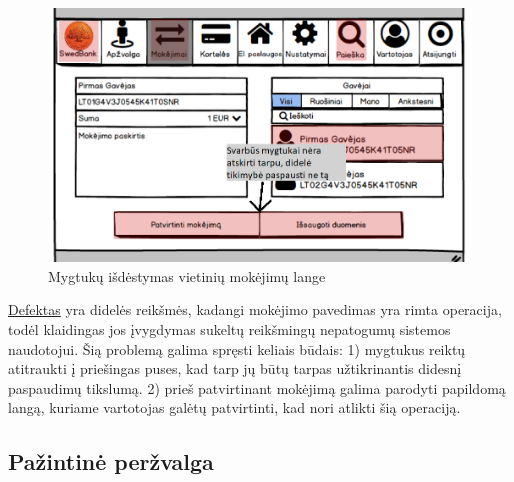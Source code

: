 \documentclass[oneside]{VUMIFPSkursinis}
\begin{document}
\begin{figure}[H]
	\includegraphics[scale=0.55]{MokejimoPatvirtinimasKlaiduPrevencija.png}
  \caption{Mygtukų išdėstymas vietinių mokėjimų lange}
	\label{fig:klaiduPrevencijaMygtukai}
\end{figure}
\hyperref[lentele:klaiduPrevencijaJ]{Defektas} yra didelės reikšmės, kadangi mokėjimo pavedimas yra rimta operacija, todėl klaidingas jos įvygdymas sukeltų reikšmingų nepatogumų sistemos naudotojui. Šią problemą galima spręsti keliais būdais: 1) mygtukus reiktų atitraukti į priešingas puses, kad tarp jų būtų tarpas užtikrinantis didesnį paspaudimų tikslumą. 2) prieš patvirtinant mokėjimą galima parodyti papildomą langą, kuriame vartotojas galėtų patvirtinti, kad nori atlikti šią operaciją.

\subsection{Pažintinė peržvalga}
\end{document}
